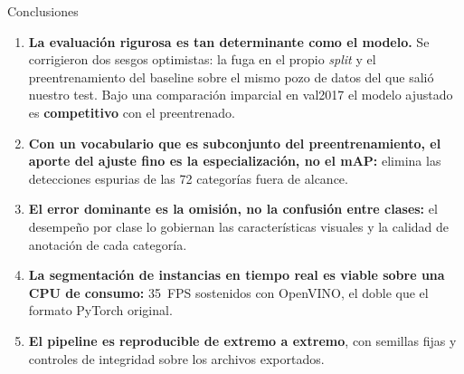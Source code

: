 \documentclass[aspectratio=169,11pt]{beamer}
\begin{document}
\begin{frame}{Conclusiones}
  \begin{enumerate}
    \item \textbf{La evaluación rigurosa es tan determinante como el modelo.} Se
          corrigieron dos sesgos optimistas: la fuga en el propio \emph{split} y el
          preentrenamiento del baseline sobre el mismo pozo de datos del que salió nuestro
          test. Bajo una comparación imparcial en val2017 el modelo ajustado es
          \textbf{competitivo} con el preentrenado.
    \vspace{0.3em}
    \item \textbf{Con un vocabulario que es subconjunto del preentrenamiento, el aporte del
          ajuste fino es la especialización, no el mAP:} elimina las detecciones espurias
          de las 72 categorías fuera de alcance.
    \vspace{0.3em}
    \item \textbf{El error dominante es la omisión, no la confusión entre clases:} el
          desempeño por clase lo gobiernan las características visuales y la calidad de
          anotación de cada categoría.
    \vspace{0.3em}
    \item \textbf{La segmentación de instancias en tiempo real es viable sobre una CPU de
          consumo:} 35~FPS sostenidos con OpenVINO, el doble que el formato PyTorch
          original.
    \vspace{0.3em}
    \item \textbf{El pipeline es reproducible de extremo a extremo}, con semillas fijas y
          controles de integridad sobre los archivos exportados.
  \end{enumerate}
\end{frame}
\end{document}
